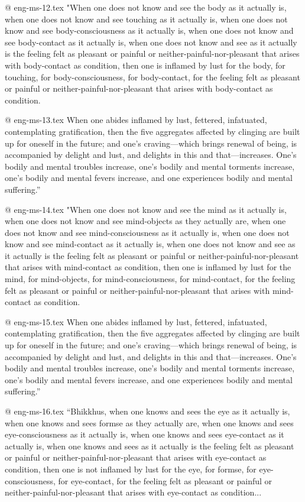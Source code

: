@ eng-ms-12.tex
"When one does not know and see the body as it actually is, when one does not know and see touching as it actually is, when one does not know and see body-consciousness as it actually is, when one does not know and see body-contact as it actually is, when one does not know and see as it actually is the feeling felt as pleasant or painful or neither-painful-nor-pleasant that arises with body-contact as condition, then one is inflamed by lust for the body, for touching, for body-consciousness, for body-contact, for the feeling felt as pleasant or painful or neither-painful-nor-pleasant that arises with body-contact as condition.

@ eng-ms-13.tex
When one abides inflamed by lust, fettered, infatuated, contemplating gratification, then the five aggregates affected by clinging are built up for oneself in the future; and one’s craving—which brings renewal of being, is accompanied by delight and lust, and delights in this and that—increases. One’s bodily and mental troubles increase, one’s bodily and mental torments increase, one’s bodily and mental fevers increase, and one experiences bodily and mental suffering.”

@ eng-ms-14.tex
"When one does not know and see the mind as it actually is, when one does not know and see mind-objects as they actually are, when one does not know and see mind-consciousness as it actually is, when one does not know and see mind-contact as it actually is, when one does not know and see as it actually is the feeling felt as pleasant or painful or neither-painful-nor-pleasant that arises with mind-contact as condition, then one is inflamed by lust for the mind, for mind-objects, for mind-consciousness, for mind-contact, for the feeling felt as pleasant or painful or neither-painful-nor-pleasant that arises with mind-contact as condition.

@ eng-ms-15.tex
When one abides inflamed by lust, fettered, infatuated, contemplating gratification, then the five aggregates affected by clinging are built up for oneself in the future; and one’s craving—which brings renewal of being, is accompanied by delight and lust, and delights in this and that—increases. One’s bodily and mental troubles increase, one’s bodily and mental torments increase, one’s bodily and mental fevers increase, and one experiences bodily and mental suffering.”

@ eng-ms-16.tex
“Bhikkhus, when one knows and sees the eye as it actually is, when one knows and sees formse as they actually are, when one knows and sees eye-consciousness as it actually is, when one knows and sees eye-contact as it actually is, when one knows and sees as it actually is the feeling felt as pleasant or painful or neither-painful-nor-pleasant that arises with eye-contact as condition, then one is not inflamed by lust for the eye, for formse, for eye-consciousness, for eye-contact, for the feeling felt as pleasant or painful or neither-painful-nor-pleasant that arises with eye-contact as condition...

